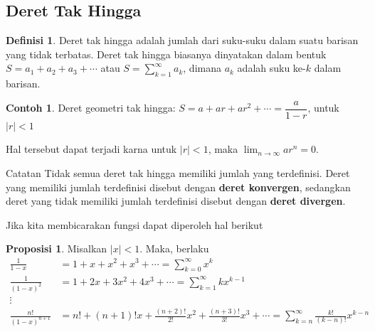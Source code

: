 \documentclass[aspectratio=169]{beamer}
\theoremstyle{definition}
\newtheorem{definisi}{Definisi}
\newtheorem{contoh}{Contoh}
\newtheorem{proposisi}{Proposisi}
\begin{document}
\subsection{Deret Tak Hingga}
\begin{frame}{\insertsection}{\insertsubsection}
  \begin{definisi}
    Deret tak hingga adalah jumlah dari suku-suku dalam suatu barisan yang tidak terbatas. Deret tak hingga biasanya dinyatakan dalam bentuk $S = a_1 + a_2 + a_3 + \cdots$ atau $S = \sum_{k=1}^\infty a_k$, dimana $a_k$ adalah suku ke-$k$ dalam barisan.
  \end{definisi}
  \begin{contoh}
    Deret geometri tak hingga: $S = a + a r + a r^2 + \cdots = \dfrac{a}{1 - r}$, untuk $|r| < 1$
  \end{contoh}
  Hal tersebut dapat terjadi karna untuk $|r| < 1$, maka $\lim_{n \to \infty} a r^n = 0$.
  \begin{alertblock}{Catatan}
    Tidak semua deret tak hingga memiliki jumlah yang terdefinisi. Deret yang memiliki jumlah terdefinisi disebut dengan \textbf{deret konvergen}, sedangkan deret yang tidak memiliki jumlah terdefinisi disebut dengan \textbf{deret divergen}.
  \end{alertblock}
\end{frame}
\begin{frame}{\insertsection}{\insertsubsection}
  Jika kita membicarakan fungsi dapat diperoleh hal berikut
  \begin{proposisi}
    Misalkan $|x| < 1$. Maka, berlaku
    \begin{align*}
      \frac{1}{1-x}          & = 1 + x + x^2 + x^3 + \cdots = \sum_{k=0}^\infty x^k                                                                \\
      \frac{1}{(1-x)^2}      & = 1 + 2x + 3x^2 + 4x^3 + \cdots = \sum_{k=1}^\infty kx^{k-1}                                                        \\
      \vdots                 &                                                                                                                     \\
      \frac{n!}{(1-x)^{n+1}} & = n! + (n+1)!x + \frac{(n+2)!}{2!}x^2 + \frac{(n+3)!}{3!}x^3 + \cdots = \sum_{k=n}^\infty \frac{k!}{(k-n)!} x^{k-n}
    \end{align*}
  \end{proposisi}
\end{frame}
\end{document}
